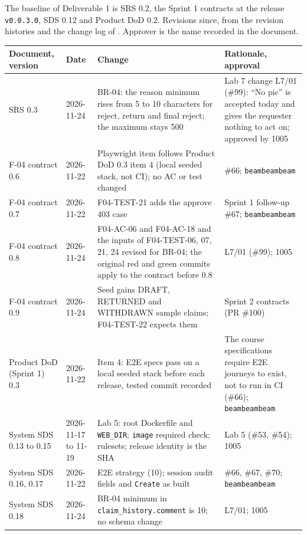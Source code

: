 \label{A:3}

The baseline of Deliverable 1 is SRS 0.2, the Sprint 1 contracts at the release \texttt{v0.0.3.0}, SDS 0.12 and Product DoD 0.2. Revisions since, from the revision histories and the change log of . Approver is the name recorded in the document.

{\footnotesize\setlength{\tabcolsep}{3pt}
\begin{longtable}{@{}p{3.0cm}p{1.9cm}p{6.7cm}p{4.6cm}@{}}
\toprule \textbf{Document, version} & \textbf{Date} & \textbf{Change} & \textbf{Rationale, approval} \\ \midrule \endhead
SRS 0.3 & 2026-11-24 & BR-04: the reason minimum rises from 5 to 10 characters for reject, return and final reject; the maximum stays 500 & Lab 7 change L7/01 (\#99): ``No pic'' is accepted today and gives the requester nothing to act on; approved by 1005 \\
F-04 contract 0.6 & 2026-11-22 & Playwright item follows Product DoD 0.3 item 4 (local seeded stack, not CI); no AC or test changed & \#66; \texttt{beambeambeam} \\
F-04 contract 0.7 & 2026-11-22 & F04-TEST-21 adds the approve 403 case & Sprint 1 follow-up \#67; \texttt{beambeambeam} \\
F-04 contract 0.8 & 2026-11-24 & F04-AC-06 and F04-AC-18 and the inputs of F04-TEST-06, 07, 21, 24 revised for BR-04; the original red and green commits apply to the contract before 0.8 & L7/01 (\#99); 1005 \\
F-04 contract 0.9 & 2026-11-24 & Seed gains DRAFT, RETURNED and WITHDRAWN sample claims; F04-TEST-22 expects them & Sprint 2 contracts (PR \#100) \\
Product DoD (Sprint 1) 0.3 & 2026-11-22 & Item 4: E2E specs pass on a local seeded stack before each release, tested commit recorded & The course specifications require E2E journeys to exist, not to run in CI (\#66); \texttt{beambeambeam} \\
System SDS 0.13 to 0.15 & 2026-11-17 to 11-19 & Lab 5: root Dockerfile and \texttt{WEB\_DIR}; \texttt{image} required check; rulesets; release identity is the SHA & Lab 5 (\#53, \#54); 1005 \\
System SDS 0.16, 0.17 & 2026-11-22 & E2E strategy (10); session audit fields and \texttt{Create} as built & \#66, \#67, \#70; \texttt{beambeambeam} \\
System SDS 0.18 & 2026-11-24 & BR-04 minimum in \texttt{claim\_history.comment} is 10; no schema change & L7/01; 1005 \\

\end{longtable}}
